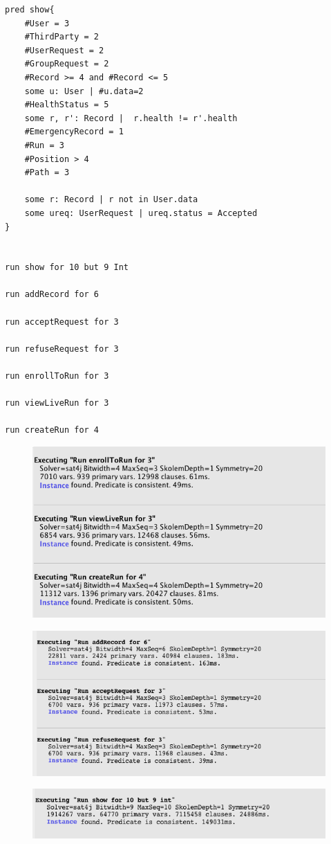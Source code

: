 \begin{verbatim}
pred show{
	#User = 3
	#ThirdParty = 2
	#UserRequest = 2
	#GroupRequest = 2
	#Record >= 4 and #Record <= 5
	some u: User | #u.data=2
	#HealthStatus = 5
	some r, r': Record |  r.health != r'.health
	#EmergencyRecord = 1
	#Run = 3
	#Position > 4
	#Path = 3
	
	some r: Record | r not in User.data
	some ureq: UserRequest | ureq.status = Accepted
}


run show for 10 but 9 Int

run addRecord for 6

run acceptRequest for 3

run refuseRequest for 3

run enrollToRun for 3

run viewLiveRun for 3

run createRun for 4

\end{verbatim}

\begin{figure}[H]
    \centering
    \includegraphics[scale=0.6]{./Pictures/alloy/run1.png}
\end{figure}
\begin{figure}[H]
    \centering
    \includegraphics[scale=0.567]{./Pictures/alloy/run2.png}
\end{figure}
\begin{figure}[H]
    \centering
    \includegraphics[scale=0.586]{./Pictures/alloy/run3.png}
\end{figure}

